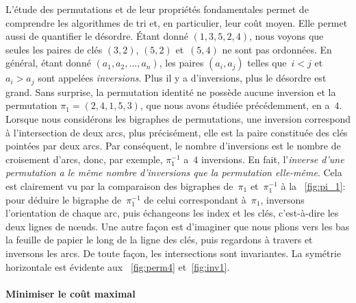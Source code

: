 L'étude des permutations et de leur propriétés fondamentales permet de
comprendre les algorithmes de tri et, en particulier, leur coût
moyen. Elle permet aussi de quantifier le désordre. Étant donné
\((1,3,5,2,4)\), nous voyons que seules les paires de clés \((3,2)\),
\((5,2)\) et~\((5,4)\) ne sont pas ordonnées. En général, étant donné
\((a_1, a_2, \dots, a_n)\), les paires \((a_i,a_j)\) telles que~\(i <
j\) et~\(a_i > a_j\) sont appelées
\emph{inversions}. Plus il y a
d'inversions, plus le désordre est grand. Sans surprise, la
permutation identité ne possède aucune
inversion et la permutation \(\pi_1 = (2,4,1,5,3)\), que nous avons
étudiée précédemment, en a~\(4\). Lorsque nous considérons les
bigraphes de permutations, une
inversion correspond à l'intersection de
deux arcs, plus précisément, elle est la paire constituée des clés
pointées par deux arcs. Par conséquent, le nombre d'inversions
 est le nombre de croisement d'arcs,
donc, par exemple, \(\pi_1^{-1}\) a~\(4\) inversions. En fait,
l'\emph{inverse d'une permutation a le même
  nombre d'inversions que la
  permutation elle-même}. Cela est clairement vu
par la comparaison des bigraphes
de~\(\pi_1\) et~\(\pi_1^{-1}\) à la \fig~\vref{fig:pi_1}: pour déduire
le bigraphe de~\(\pi_1^{-1}\) de celui correspondant à~\(\pi_1\),
inversons l'orientation de chaque arc, puis échangeons les index et
les clés, c'est-à-dire les deux lignes de nœuds. Une autre façon
est d'imaginer que nous plions vers les bas la feuille de papier le
long de la ligne des clés, puis regardons à travers et inversons les
arcs. De toute façon, les intersections sont invariantes. La symétrie
horizontale est évidente aux \figs~\ref{fig:perm4} et~\ref{fig:inv1}.

\paragraph{Minimiser le coût maximal}
\label{par:minimax}

